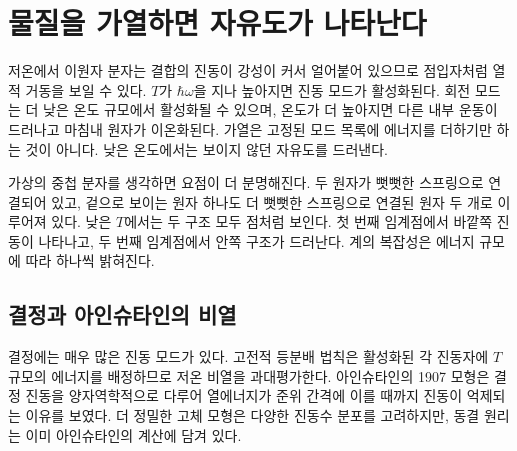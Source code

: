 \section{물질을 가열하면 자유도가 나타난다}

저온에서 이원자 분자는 결합의 진동이 강성이 커서 얼어붙어 있으므로 점입자처럼 열적 거동을 보일 수 있다. \(T\)가 \(\hbar\omega\)을 지나 높아지면 진동 모드가 활성화된다. 회전 모드는 더 낮은 온도 규모에서 활성화될 수 있으며, 온도가 더 높아지면 다른 내부 운동이 드러나고 마침내 원자가 이온화된다. 가열은 고정된 모드 목록에 에너지를 더하기만 하는 것이 아니다. 낮은 온도에서는 보이지 않던 자유도를 드러낸다.

가상의 중첩 분자를 생각하면 요점이 더 분명해진다. 두 원자가 뻣뻣한 스프링으로 연결되어 있고, 겉으로 보이는 원자 하나도 더 뻣뻣한 스프링으로 연결된 원자 두 개로 이루어져 있다. 낮은 \(T\)에서는 두 구조 모두 점처럼 보인다. 첫 번째 임계점에서 바깥쪽 진동이 나타나고, 두 번째 임계점에서 안쪽 구조가 드러난다. 계의 복잡성은 에너지 규모에 따라 하나씩 밝혀진다.

\begin{classroomqa}
\end{classroomqa}

\subsection{결정과 아인슈타인의 비열}

결정에는 매우 많은 진동 모드가 있다. 고전적 등분배 법칙은 활성화된 각 진동자에 \(T\) 규모의 에너지를 배정하므로 저온 비열을 과대평가한다. 아인슈타인의 1907 모형은 결정 진동을 양자역학적으로 다루어 열에너지가 준위 간격에 이를 때까지 진동이 억제되는 이유를 보였다. 더 정밀한 고체 모형은 다양한 진동수 분포를 고려하지만, 동결 원리는 이미 아인슈타인의 계산에 담겨 있다.

\begin{classroomqa}
\end{classroomqa}

